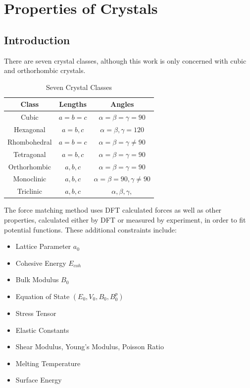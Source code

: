 \section{Properties of Crystals}

\subsection{Introduction}

There are seven crystal classes, although this work is only concerned with cubic and orthorhombic crystals.  

\begin{table}[h]
\caption{Seven Crystal Classes}
\begin{center}
\begin{tabular}{c c c}
Class & Lengths & Angles \\
\hline\hline
Cubic & $a = b = c$ & $ \alpha = \beta = \gamma = 90 $ \\
Hexagonal & $a = b, c $ & $ \alpha = \beta, \gamma = 120 $ \\
Rhombohedral & $a = b = c $ & $ \alpha = \beta = \gamma \neq 90 $ \\
Tetragonal & $a = b, c $ & $ \alpha = \beta = \gamma = 90 $ \\
Orthorhombic & $a, b, c $ & $ \alpha = \beta = \gamma = 90 $ \\
Monoclinic & $a, b, c $ & $ \alpha = \beta = 90, \gamma \neq 90 $ \\
Triclinic & $a, b, c $ & $ \alpha, \beta, \gamma, $ \\
\end{tabular}
\end{center}
\end{table}




The force matching method uses DFT calculated forces as well as other properties, calculated either by DFT or measured by experiment, in order to fit potential functions.  These additional constraints include:

\begin{itemize}
\item Lattice Parameter $a_0$
\item Cohesive Energy $E_{coh}$
\item Bulk Modulus $B_{0}$
\item Equation of State $(E_{0}, V_{0}, B_0, {B^{p}_0})$
\item Stress Tensor
\item Elastic Constants
\item Shear Modulus, Young's Modulus, Poisson Ratio
\item Melting Temperature
\item Surface Energy
\end{itemize}


